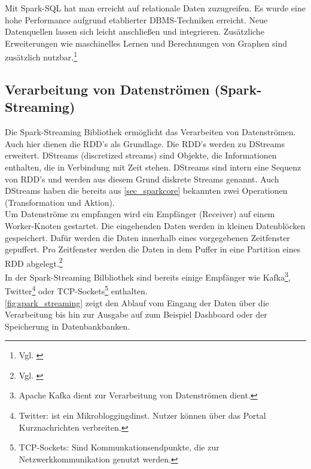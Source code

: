 \noindent
Mit Spark-SQL hat man erreicht auf relationale Daten zuzugreifen. Es wurde eine hohe Performance aufgrund etablierter DBMS-Techniken erreicht.
Neue Datenquellen lassen sich leicht anschließen und integrieren.
Zusätzliche Erweiterungen wie maschinelles Lernen und Berechnungen von Graphen sind zusätzlich nutzbar.\footnote{Vgl. \cite{AXL+15}} \\

\newpage
\subsection{Verarbeitung von Datenströmen (Spark-Streaming)}


Die Spark-Streaming Bibliothek ermöglicht das Verarbeiten von Datenströmen. Auch hier dienen die RDD's als Grundlage. Die RDD's werden zu DStreams erweitert. DStreams (discretized streams) sind Objekte, die Informationen enthalten, die in Verbindung mit Zeit stehen. DStreams sind intern eine Sequenz von RDD's und werden aus diesem Grund diskrete Streams genannt.
Auch DStreams haben die bereits aus \ref{sec_sparkcore} bekannten zwei Operationen (Transformation und Aktion). \\

\noindent
Um Datenströme zu empfangen wird ein Empfänger (Receiver) auf einem Worker-Knoten gestartet. Die eingehenden Daten werden in kleinen Datenblöcken gespeichert. Dafür werden die Daten innerhalb eines vorgegebenen Zeitfenster gepuffert. Pro Zeitfenster werden die Daten in dem Puffer in eine Partition eines RDD abgelegt.\footnote{Vgl. \cite{BDS16}} \\

\noindent
In der Spark-Streaming Bilbliothek sind bereits einige Empfänger wie Kafka\footnote{Apache Kafka dient zur Verarbeitung von Datenströmen dient.}, Twitter\footnote{Twitter: ist ein Mikrobloggingdinst. Nutzer können über das Portal Kurznachrichten verbreiten. } oder TCP-Sockets\footnote{TCP-Sockets: Sind Kommunkationsendpunkte, die zur Netzwerkkommunikation genutzt werden. } enthalten. \\
\autoref{fig:spark_streaming} zeigt den Ablauf vom Eingang der Daten über die Verarbeitung bis hin zur Ausgabe auf zum Beispiel Dashboard oder der Speicherung in Datenbankbanken.

